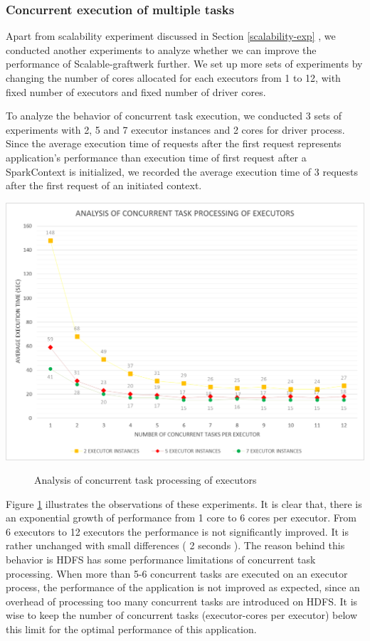 \subsubsection{\textbf{Concurrent execution of multiple tasks}}
Apart from scalability experiment discussed in Section \ref{scalability-exp} , we conducted another experiments to analyze whether we can  improve the performance of Scalable-graftwerk further. We set up more sets of experiments by changing the number of cores allocated for each executors from 1 to 12, with fixed number of executors and fixed number of driver cores. 

To analyze the behavior of concurrent task execution, we conducted 3 sets of experiments with 2, 5  and 7 executor instances and 2 cores for driver process. Since the average execution time of requests after the first request represents application's performance than execution time of first request after a SparkContext is initialized, we recorded the average execution time of 3 requests after the first request of an initiated context.
\begin{center}
	\includegraphics[width=38em]{./Figures/executor-cores2}
	\begin{figure}[htbp]
    \caption{Analysis of concurrent task processing of executors}
    \label{fig:executor-cores}
	\end{figure}
\end{center}
Figure \ref{fig:executor-cores} illustrates the observations of these experiments.  It is clear that, there is an exponential growth of performance from 1 core to 6 cores per executor. From 6 executors to 12 executors the performance is not significantly improved. It is rather unchanged with small differences ( 2 seconds ). The reason behind this behavior is HDFS has some performance limitations of concurrent task processing. When more than 5-6 concurrent tasks are executed on an executor process, the performance of the application is not improved as expected, since an overhead of processing too many concurrent tasks are introduced on HDFS. It is wise to keep the number of concurrent tasks (executor-cores per executor) below this limit for the optimal performance of this application.  

